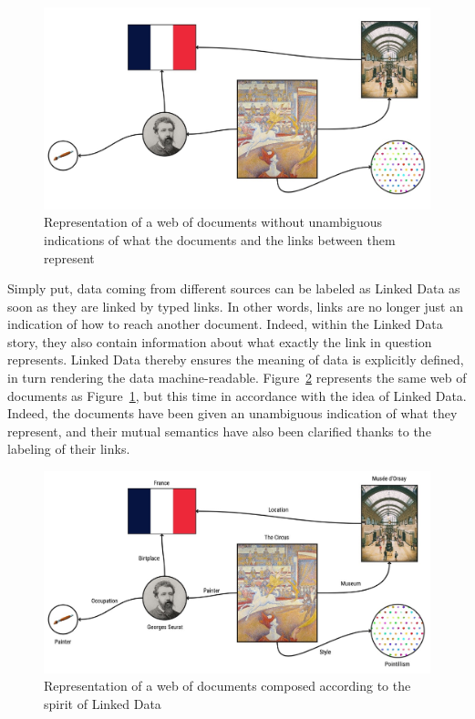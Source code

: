 \begin{figure}[htbp]
    \centering
	\includegraphics[width=\textwidth]{images/no_linked_data.jpg}
	\caption{Representation of a web of documents without unambiguous indications of what the documents and the links between them represent}
	\label{fig:no_linked_data}
\end{figure}

Simply put, data coming from different sources can be labeled as Linked Data as soon as they are linked by typed links. In other words, links are no longer just an indication of how to reach another document. Indeed, within the Linked Data story, they also contain information about what exactly the link in question represents. Linked Data thereby ensures the meaning of data is explicitly defined, in turn rendering the data machine-readable. Figure~\ref{fig:linked_data} represents the same web of documents as Figure~\ref{fig:no_linked_data}, but this time in accordance with the idea of Linked Data. Indeed, the documents have been given an  unambiguous indication of what they represent, and their mutual semantics have also been clarified thanks to the labeling of their links. \citep{bizer2011linked}

\begin{figure}[htbp]
    \centering
	\includegraphics[width=\textwidth]{images/linked_data.jpg}
	\caption{Representation of a web of documents composed according to the spirit of Linked Data}
	\label{fig:linked_data}
\end{figure}

